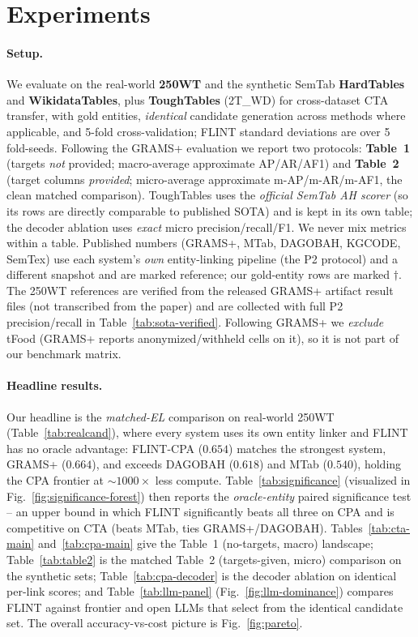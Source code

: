 \documentclass[11pt]{article}
\begin{document}
\section{Experiments}
\label{sec:experiments}

\paragraph{Setup.} We evaluate on the real-world \textbf{250WT} and the synthetic
SemTab \textbf{HardTables} and \textbf{WikidataTables}, plus \textbf{ToughTables}
(2T\_WD) for cross-dataset CTA transfer, with gold entities, \emph{identical} candidate
generation across methods where applicable, and 5-fold cross-validation; FLINT standard
deviations are over 5 fold-seeds. Following the GRAMS+ evaluation we report two
protocols: \textbf{Table~1} (targets \emph{not} provided; macro-average approximate
AP/AR/AF1) and \textbf{Table~2} (target columns \emph{provided}; micro-average
approximate m-AP/m-AR/m-AF1, the clean matched comparison). ToughTables uses the
\emph{official SemTab AH scorer} (so its rows are directly comparable to published SOTA)
and is kept in its own table; the decoder ablation uses \emph{exact} micro
precision/recall/F1. We never mix metrics within a table. Published numbers (GRAMS+,
MTab, DAGOBAH, KGCODE, SemTex) use each system's \emph{own} entity-linking pipeline (the
P2 protocol) and a different snapshot and are marked reference; our gold-entity rows are
marked $\dagger$. The 250WT references are verified from the released GRAMS+ artifact
result files (not transcribed from the paper) and are collected with full P2
precision/recall in Table~\ref{tab:sota-verified}. Following GRAMS+ we \emph{exclude}
tFood (GRAMS+ reports anonymized/withheld cells on it), so it is not part of our
benchmark matrix.

\paragraph{Headline results.} Our headline is the \emph{matched-EL} comparison on
real-world 250WT (Table~\ref{tab:realcand}), where every system uses its own entity
linker and FLINT has no oracle advantage: FLINT-CPA ($0.654$) matches the strongest
system, GRAMS+ ($0.664$), and exceeds DAGOBAH ($0.618$) and MTab ($0.540$), holding the
CPA frontier at $\sim$$1000\times$ less compute. Table~\ref{tab:significance} (visualized
in Fig.~\ref{fig:significance-forest}) then reports the \emph{oracle-entity} paired
significance test -- an upper bound in which FLINT significantly beats all three on CPA
and is competitive on CTA (beats MTab, ties GRAMS+/DAGOBAH). Tables~\ref{tab:cta-main}
and~\ref{tab:cpa-main} give the Table~1 (no-targets, macro) landscape; Table~\ref{tab:table2}
is the matched Table~2 (targets-given, micro) comparison on the synthetic sets;
Table~\ref{tab:cpa-decoder} is the decoder ablation on identical per-link scores; and
Table~\ref{tab:llm-panel} (Fig.~\ref{fig:llm-dominance}) compares FLINT against frontier
and open LLMs that select from the identical candidate set. The overall accuracy-vs-cost
picture is Fig.~\ref{fig:pareto}.
\end{document}
